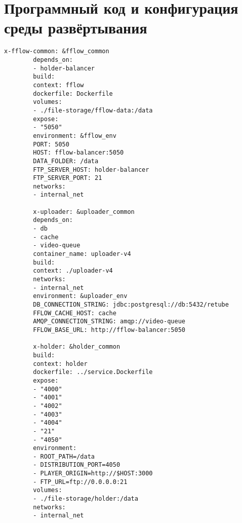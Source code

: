 \chapter{Программный код и конфигурация среды развёртывания}
\label{chap:docker_compose_code}

	\begin{lstlisting}[caption={Конфигурация Docker Compose}]
		x-fflow-common: &fflow_common
		depends_on:
		- holder-balancer
		build:
		context: fflow
		dockerfile: Dockerfile
		volumes:
		- ./file-storage/fflow-data:/data
		expose:
		- "5050"
		environment: &fflow_env
		PORT: 5050
		HOST: fflow-balancer:5050
		DATA_FOLDER: /data
		FTP_SERVER_HOST: holder-balancer
		FTP_SERVER_PORT: 21
		networks:
		- internal_net
		
		x-uploader: &uploader_common
		depends_on:
		- db
		- cache
		- video-queue
		container_name: uploader-v4
		build:
		context: ./uploader-v4
		networks:
		- internal_net
		environment: &uploader_env
		DB_CONNECTION_STRING: jdbc:postgresql://db:5432/retube
		FFLOW_CACHE_HOST: cache
		AMQP_CONNECTION_STRING: amqp://video-queue
		FFLOW_BASE_URL: http://fflow-balancer:5050
		
		x-holder: &holder_common
		build:
		context: holder
		dockerfile: ../service.Dockerfile
		expose:
		- "4000"
		- "4001"
		- "4002"
		- "4003"
		- "4004"
		- "21"
		- "4050"
		environment:
		- ROOT_PATH=/data
		- DISTRIBUTION_PORT=4050
		- PLAYER_ORIGIN=http://$HOST:3000
		- FTP_URL=ftp://0.0.0.0:21
		volumes:
		- ./file-storage/holder:/data
		networks:
		- internal_net
		

\end{lstlisting}
